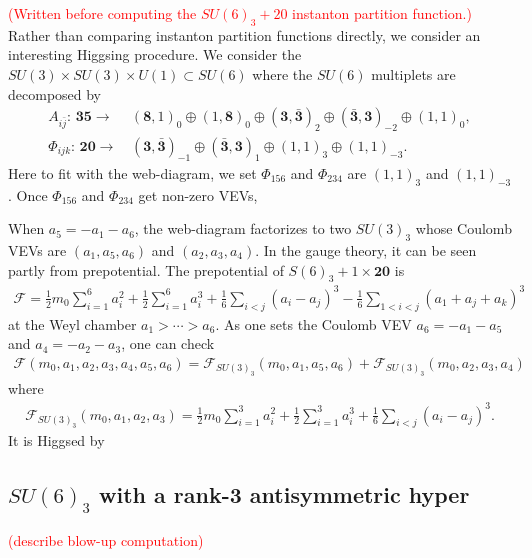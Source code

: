 \documentclass[letterpaper, 11pt]{article}
\begin{document}
\textcolor{red}{(Written before computing the $SU(6)_3+20$ instanton partition function.)}\\
Rather than comparing instanton partition functions directly, we consider an interesting Higgsing procedure. We consider the $SU(3)\times SU(3)\times U(1)\subset SU(6)$ where the $SU(6)$ multiplets are decomposed by
\begin{align}
A_{i\bar{j}}:\,\boldsymbol{35}\longrightarrow&\,(\boldsymbol{8},1)_0\oplus (1,\boldsymbol{8})_0\oplus (\boldsymbol{3},\bar{\boldsymbol{3}})_2\oplus(\bar{\boldsymbol{3}},\boldsymbol{3})_{-2}\oplus(1,1)_0,\nonumber\\
\Phi_{ijk}:\,\boldsymbol{20}\longrightarrow&\,(\boldsymbol{3},\bar{\boldsymbol{3}})_{-1}\oplus(\bar{\boldsymbol{3}},\boldsymbol{3})_1\oplus(1,1)_3\oplus(1,1)_{-3}.
\end{align} 
Here to fit with the web-diagram, we set $\Phi_{156}$ and $\Phi_{234}$ are $(1,1)_3$ and $(1,1)_{-3}$. Once $\Phi_{156}$ and $\Phi_{234}$ get non-zero VEVs, 

 When $a_5=-a_1-a_6$, the web-diagram factorizes to two $SU(3)_3$ whose Coulomb VEVs are $(a_1, a_5, a_6)$ and $(a_2, a_3, a_4)$. In the gauge theory, it can be seen partly from prepotential. The prepotential of $S(6)_3+1\times\boldsymbol{20}$ is
\begin{align}
\mathcal{F}=\frac{1}{2}m_0\sum_{i=1}^{6}a_i^2+\frac{1}{2}\sum_{i=1}^{6}a_i^3+\frac{1}{6}\sum_{i<j}(a_i-a_j)^3-\frac{1}{6}\sum_{1<i<j}(a_1+a_j+a_k)^3
\end{align}
at the Weyl chamber $a_1>\cdots>a_6$. As one sets the Coulomb VEV $a_6=-a_1-a_5$ and $a_4=-a_2-a_3$, one can check
\begin{align}
\mathcal{F}(m_0,a_1,a_2,a_3,a_4,a_5,a_6)=\mathcal{F}_{SU(3)_3}(m_0,a_1,a_5,a_6)+\mathcal{F}_{SU(3)_3}(m_0,a_2,a_3,a_4)
\end{align}
where
\begin{align}
\mathcal{F}_{SU(3)_3}(m_0,a_1,a_2,a_3)=\frac{1}{2}m_0\sum_{i=1}^{3}a_i^2+\frac{1}{2}\sum_{i=1}^{3}a_i^3+\frac{1}{6}\sum_{i<j}(a_i-a_j)^3.
\end{align}
It is Higgsed by 



\subsection{$SU(6)_3$ with a rank-3 antisymmetric hyper}

\textcolor{red}{(describe blow-up computation)}
\end{document}
